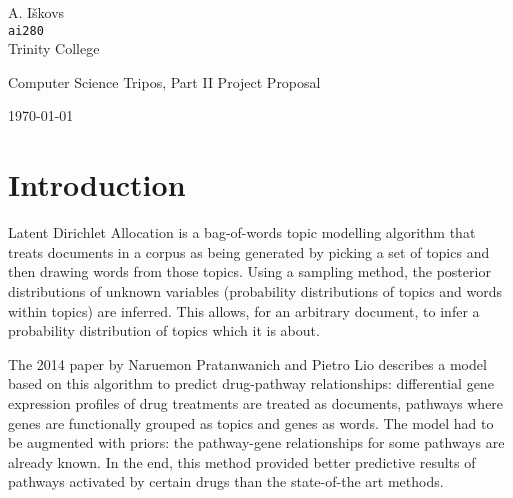 \documentclass[12pt,a4]{article}
\begin{document}
\vfil


\begin{flushright}
\large{A. I\v{s}kovs}\\
\texttt{ai280}\\
Trinity College
\end{flushright}

\vspace*{\fill}
\begin{center}{\large Computer Science Tripos, Part II Project Proposal}

\vspace{0.3in}
\textbf{}

\vspace{0.4in}
\centerline{\large \today}
\end{center}
\vspace*{\fill}

\vfil

%
%
%
%
%
% 
%

\pagebreak


\section*{Introduction}

Latent Dirichlet Allocation\cite{Blei} is a bag-of-words topic modelling algorithm that treats documents in a corpus as being generated by picking a set of topics and then drawing words from those topics. Using a sampling method, the posterior distributions of unknown variables (probability distributions of topics and words within topics) are inferred. This allows, for an arbitrary document, to infer a probability distribution of topics which it is about.

The 2014 paper\cite{Pratanwanich2014} by Naruemon Pratanwanich and Pietro Lio describes a model based on this algorithm to predict drug-pathway relationships: differential gene expression profiles of drug treatments are treated as documents, pathways where genes are functionally grouped as topics and genes as words. The model had to be augmented with priors: the pathway-gene relationships for some pathways are already known. In the end, this method provided better predictive results of pathways activated by certain drugs than the state-of-the art methods.
\end{document}
